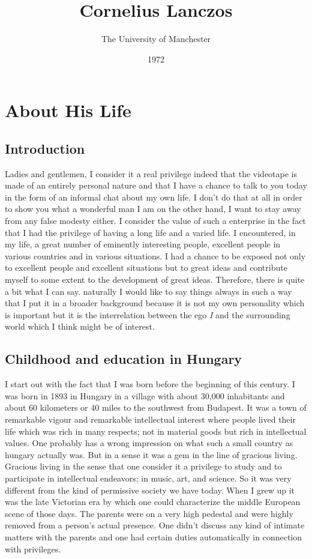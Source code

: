 \documentclass{article}
\title{Cornelius Lanczos}
\author{The University of Manchester}
\date{1972}
\begin{document}
\maketitle

\newpage
\tableofcontents
\newpage

\section{About His Life}
\subsection{Introduction}
Ladies and gentlemen, I consider it a real privilege indeed that the videotape is made of an entirely personal nature and that I have a chance to talk to you today in the form of an informal chat about my own life. I don't do that at all in order to show you what a wonderful man I am on the other hand, I want to stay away from any false modesty either. I consider the value of such a enterprise in the fact that I had the privilege of having a long life and a varied life. I encountered, in my life, a great number of eminently interesting people, excellent people in various countries and in various situations. I had a chance to be exposed not only to excellent people and excellent situations but to great ideas and contribute myself to some extent to the development of great ideas. Therefore, there is quite a bit what I can say. naturally I would like to say things always in such a way that I put it in a broader background because it is not my own personality which is important but it is the interrelation between the ego \textit{I} and the surrounding world which I think might be of interest.

\subsection{Childhood and education in Hungary}
I start out with the fact that I was born before the beginning of this century. I was born in 1893 in Hungary in a village with about 30,000 inhabitants and about 60 kilometers or 40 miles to the southwest from Budapest. It was a town of remarkable vigour and remarkable intellectual interest where people lived their life which was rich in many respects; not in material goods but rich in intellectual values. One probably has a wrong impression on what such a small country as hungary actually was. But in a sense it was a gem in the line of gracious living. Gracious living in the sense that one consider it a privilege to study and to participate in intellectual endeavors; in music, art, and science. So it was very different from the kind of permissive society we have today. When I grew up it was the late Victorian era by which one could characterize the middle European scene of those days. The parents were on a very high pedestal and were highly removed from a person's actual presence. One didn't discuss any kind of intimate matters with the parents and one had certain duties automatically in connection with privileges. 
\end{document}
